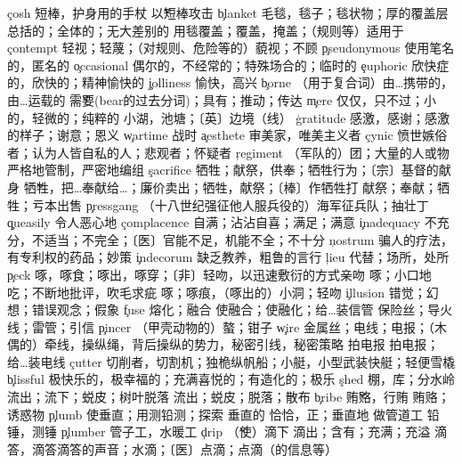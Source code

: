\begin{multicols}{2}
\c{cosh}  \n 短棒，护身用的手杖 \v 以短棒攻击
\c{blanket}  \n 毛毯，毯子；毯状物；厚的覆盖层 \a 总括的；全体的；无大差别的 \vt 用毯覆盖；覆盖，掩盖；（规则等）适用于
\c{contempt}  \n 轻视；轻蔑；（对规则、危险等的）藐视；不顾
\c{pseudonymous}  \a 使用笔名的，匿名的
\c{occasional}  \a 偶尔的，不经常的；特殊场合的；临时的
\c{euphoric}  \a 欣快症的，欣快的；精神愉快的
\c{jolliness}  \n 愉快，高兴
\c{borne}  \a （用于复合词）由…携带的，由…运载的 \v 需要(bear的过去分词)；具有；推动；传达
\c{mere}  \a 仅仅，只不过；小的，轻微的；纯粹的 \n 小湖，池塘；〔英〕边境（线）
\c{gratitude}  \n 感激，感谢；感激的样子；谢意；恩义
\c{wartime}  \n 战时
\c{aesthete}  \n 审美家，唯美主义者
\c{cynic}  \n 愤世嫉俗者；认为人皆自私的人；悲观者；怀疑者
\c{regiment}  \n （军队的）团；大量的人或物 \vt 严格地管制，严密地编组
\c{sacrifice}  \n 牺牲；献祭，供奉；牺牲行为；〔宗〕基督的献身 \v 牺牲，把…奉献给…；廉价卖出；牺牲，献祭；〔棒〕作牺牲打 \vt 献祭；奉献；牺牲；亏本出售
\c{pressgang}  \n （十八世纪强征他人服兵役的）海军征兵队；抽壮丁
\c{queasily}  \ad 令人恶心地
\c{complacence}  \n 自满；沾沾自喜；满足；满意
\c{inadequacy}  \n 不充分，不适当；不完全；〔医〕官能不足，机能不全；不十分
\c{nostrum}  \n 骗人的疗法，有专利权的药品；妙策
\c{indecorum}  \n 缺乏教养，粗鲁的言行
\c{lieu}  \n 代替；场所，处所
\c{peck}  \vt 啄，啄食；啄出，啄穿；〔非〕轻吻，以迅速敷衍的方式亲吻 \vi 啄；小口地吃；不断地批评，吹毛求疵 \n 啄；啄痕，（啄出的）小洞；轻吻
\c{illusion}  \n 错觉；幻想；错误观念；假象
\c{fuse}  \vi 熔化；融合 \vt 使融合；使融化；给…装信管 \n 保险丝；导火线；雷管；引信
\c{pincer}  \n （甲壳动物的）螯；钳子
\c{wire}  \n 金属丝；电线；电报；（木偶的）牵线，操纵绳，背后操纵的势力，秘密引线，秘密策略 \vi 拍电报 \vt 拍电报；给…装电线
\c{cutter}  \n 切削者，切割机；独桅纵帆船；小艇，小型武装快艇；轻便雪橇
\c{blissful}  \a 极快乐的，极幸福的；充满喜悦的；有造化的；极乐
\c{shed}  \n 棚，库；分水岭 \vt 流出；流下；蜕皮；树叶脱落 \vi 流出；蜕皮；脱落；散布
\c{bribe}  \v 贿赂，行贿 \n 贿赂；诱惑物
\c{plumb}  \vt 使垂直；用测铅测；探索 \a 垂直的 \ad 恰恰，正；垂直地 \vi 做管道工 \n 铅锤，测锤
\c{plumber}  \n 管子工，水暖工
\c{drip}  \v （使）滴下 \vi 滴出；含有；充满；充溢 \n 滴答，滴答滴答的声音；水滴；〔医〕点滴；点滴（的信息等）

\end{multicols}
